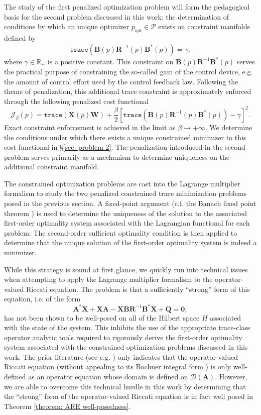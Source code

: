 \documentclass{amsart}
\newcommand{\br}[1]{\left[ #1 \right]}
\newcommand{\trace}[1]{\texttt{trace}\left( #1\right)}
\newcommand{\sP}{\mathcal{P}}
\newcommand{\bA}{\mathbf A}
\newcommand{\bX}{\mathbf X}
\newcommand{\bQ}{\mathbf Q}
\newcommand{\bW}{\mathbf W}
\begin{document}
The study of the first penalized optimization problem will form the pedagogical basis for the second problem discussed in this work: the determination of conditions by which an unique optimizer $p_{opt} \in \sP$ exists on constraint manifolds defined by
$$
    \trace{\mathbf B(p)\mathbf R^{-1}(p) \mathbf B^*(p)} = \gamma,
$$
where $\gamma \in \mathbb R_+$ is a positive constant. This constraint on $\mathbf B(p)\mathbf R^{-1} \mathbf B^*(p)$ serves the practical purpose of constraining the so-called gain of the control device, e.g. the amount of control effort used by the control feedback law. Following the theme of penalization, this additional trace constraint is approximately enforced through the following penalized cost functional
$$
    \mathcal J_\beta(p) = \trace{\bX(p)\bW} + \frac{\beta}{2}\br{\trace{\mathbf B(p) \mathbf R^{-1} (p) \mathbf B^*(p)} - \gamma}^2.
$$
Exact constraint enforcement is achieved in the limit as $\beta \rightarrow +\infty$. We determine the conditions under which there exists a unique constrained minimizer to this cost functional in \S\ref{sec: problem 2}. The penalization introduced in the second problem serves primarily as a mechanism to determine uniqueness on the additional constraint manifold. 

The constrained optimization problems are cast into the Lagrange multiplier formalism to study the two penalized constrained trace minimization problems posed in the previous section. A fixed-point argument (c.f. the Banach fixed point theorem \cite[Theorem 3.7-1]{ciarlet2025linear}) is used to determine the uniqueness of the solution to the associated first-order optimality system associated with the Lagrangian functional for each problem. The second-order sufficient optimality condition is then applied to determine that the unique solution of the first-order optimality system is indeed a minimizer. 

While this strategy is sound at first glance, we quickly run into technical issues when attempting to apply the Lagrange multiplier formalism to the operator-valued Riccati equation. The problem is that a sufficiently ``strong'' form of this equation, i.e. of the form
$$
    \bA^*\bX + \bX\bA-\bX\mathbf B\mathbf R^{-1} \mathbf B^*\bX + \bQ = \mathbf 0,
$$
has not been shown to be well-posed on all of the Hilbert space $H$ associated with the state of the system. This inhibits the use of the appropriate trace-class operator analytic tools required to rigorously derive the first-order optimality system associated with the constrained optimization problems discussed in this work. The prior literature (see e.g. \cite{bensoussan2007representation}) only indicates that the operator-valued Riccati equation (without appealing to its Bochner integral form \cite{burns2015solutions}) is only well-defined as an operator equation whose domain is defined on $\mathcal D(\bA)$. However, we are able to overcome this technical hurdle in this work by determining that the ``strong'' form of the operator-valued Riccati equation is in fact well posed in Theorem \ref{theorem: ARE well-posedness}. 
\end{document}
